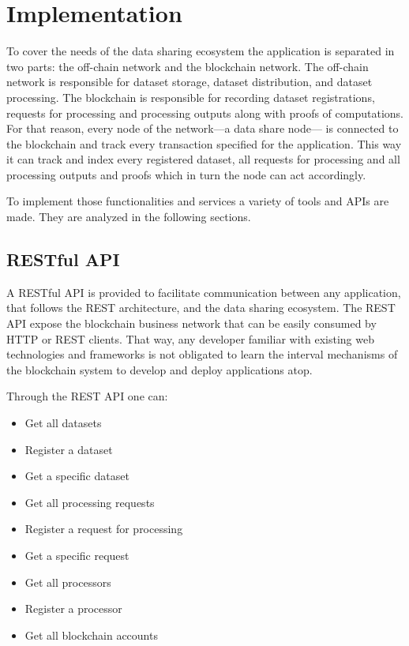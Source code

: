 \chapter{Implementation}
\label{implemenation}

To cover the needs of the data sharing ecosystem the application is separated in two parts: the off-chain network and the blockchain network. The off-chain network is responsible for dataset storage, dataset distribution, and dataset processing. The blockchain is responsible for recording dataset registrations, requests for processing and processing outputs along with proofs of computations. For that reason, every node of the network---a data share node--- is connected to the blockchain and track every transaction specified for the application. This way it can track and index every registered dataset, all requests for processing and all processing outputs and proofs which in turn the node can act accordingly.

To implement those functionalities and services a variety of tools and APIs are made. They are analyzed in the following sections.

\section{RESTful API}
\label{implemenation:rest}

A RESTful API is provided to facilitate communication between any application, that follows the REST architecture, and the data sharing ecosystem. The REST API expose the blockchain business network that can be easily consumed by HTTP or REST clients. That way, any developer familiar with existing web technologies and frameworks is not obligated to learn the interval mechanisms of the blockchain system to develop and deploy applications atop.

Through the REST API one can:

\begin{itemize}
  \item Get all datasets
  \item Register a dataset
  \item Get a specific dataset
  \item Get all processing requests
  \item Register a request for processing
  \item Get a specific request
  \item Get all processors
  \item Register a processor
  \item Get all blockchain accounts
\end{itemize}

